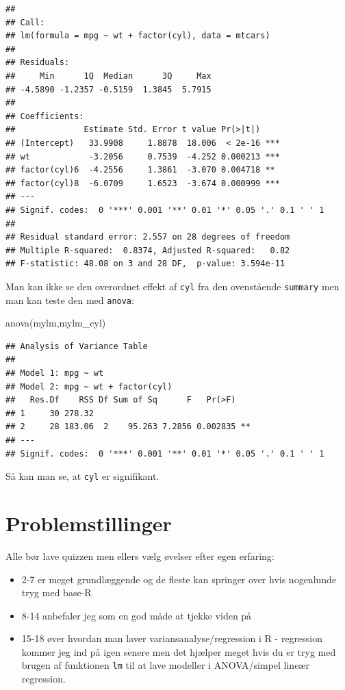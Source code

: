 \documentclass[
]{book}
\newenvironment{Shaded}{\begin{snugshade}}{\end{snugshade}}
\newcommand{\FunctionTok}[1]{\textcolor[rgb]{0.00,0.00,0.00}{#1}}
\newcommand{\NormalTok}[1]{#1}
\providecommand{\tightlist}{%
  \setlength{\itemsep}{0pt}\setlength{\parskip}{0pt}}
\begin{document}
\begin{verbatim}
## 
## Call:
## lm(formula = mpg ~ wt + factor(cyl), data = mtcars)
## 
## Residuals:
##     Min      1Q  Median      3Q     Max 
## -4.5890 -1.2357 -0.5159  1.3845  5.7915 
## 
## Coefficients:
##              Estimate Std. Error t value Pr(>|t|)    
## (Intercept)   33.9908     1.8878  18.006  < 2e-16 ***
## wt            -3.2056     0.7539  -4.252 0.000213 ***
## factor(cyl)6  -4.2556     1.3861  -3.070 0.004718 ** 
## factor(cyl)8  -6.0709     1.6523  -3.674 0.000999 ***
## ---
## Signif. codes:  0 '***' 0.001 '**' 0.01 '*' 0.05 '.' 0.1 ' ' 1
## 
## Residual standard error: 2.557 on 28 degrees of freedom
## Multiple R-squared:  0.8374, Adjusted R-squared:   0.82 
## F-statistic: 48.08 on 3 and 28 DF,  p-value: 3.594e-11
\end{verbatim}

Man kan ikke se den overordnet effekt af \texttt{cyl} fra den ovenstående \texttt{summary} men man kan teste den med \texttt{anova}:

\begin{Shaded}
\begin{Highlighting}[]
\FunctionTok{anova}\NormalTok{(mylm,mylm\_cyl)}
\end{Highlighting}
\end{Shaded}

\begin{verbatim}
## Analysis of Variance Table
## 
## Model 1: mpg ~ wt
## Model 2: mpg ~ wt + factor(cyl)
##   Res.Df    RSS Df Sum of Sq      F   Pr(>F)   
## 1     30 278.32                                
## 2     28 183.06  2    95.263 7.2856 0.002835 **
## ---
## Signif. codes:  0 '***' 0.001 '**' 0.01 '*' 0.05 '.' 0.1 ' ' 1
\end{verbatim}

Så kan man se, at \texttt{cyl} er signifikant.

\hypertarget{problemstillinger}{%
\section{Problemstillinger}\label{problemstillinger}}

Alle bør lave quizzen men ellers vælg øvelser efter egen erfaring:

\begin{itemize}
\tightlist
\item
  2-7 er meget grundlæggende og de fleste kan springer over hvis nogenlunde tryg med base-R
\item
  8-14 anbefaler jeg som en god måde at tjekke viden på
\item
  15-18 øver hvordan man laver variansanalyse/regression i R - regression kommer jeg ind på igen senere men det hjælper meget hvis du er tryg med brugen af funktionen \texttt{lm} til at lave modeller i ANOVA/simpel lineær regression.
\end{itemize}
\end{document}
